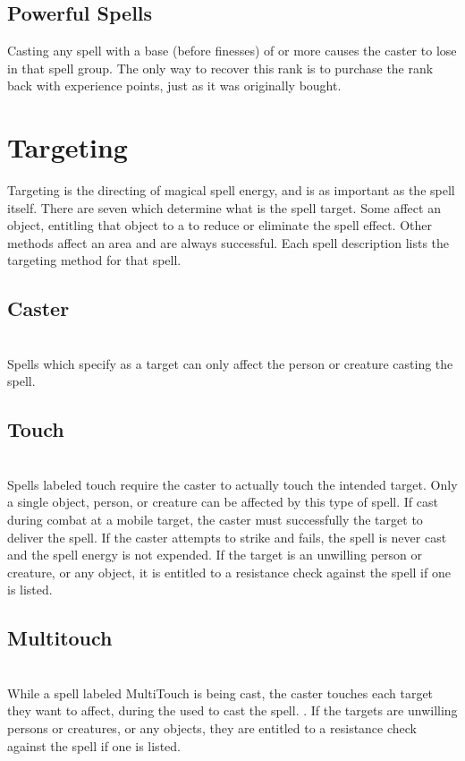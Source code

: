 \begin{multicols*}{2}
\subsection{Powerful Spells}
Casting any spell with a base  (before finesses) of  or more causes the caster to lose  in that spell group. The only way to recover this rank is to purchase the rank back with experience points, just as it was originally bought.
\section{Targeting}
Targeting is the directing of magical spell energy, and is as important as the spell itself. There are seven  which determine what is the spell target. Some affect an object, entitling that object to a  to reduce or eliminate the spell effect. Other methods affect an area and are always successful. Each spell description lists the targeting method for that spell.
\subsection{Caster}
\\
Spells which specify  as a target can only
affect the person or creature casting the spell.
\subsection{Touch}
\\
Spells labeled touch require the caster to actually touch the intended target. Only a single object, person, or creature can be affected by this type of spell. If cast during combat at a mobile target, the caster must successfully  the target to deliver the spell. If the caster attempts to strike and fails, the spell is never cast and the spell energy is not expended. If the target is an unwilling person or creature,
or any object, it is entitled to a resistance check against the spell if one is listed.
\subsection{Multitouch}
\\
While a spell labeled MultiTouch is being cast, the caster touches each target they want to affect, during the  used to cast the spell. . If the targets are unwilling persons or creatures, or any objects, they are entitled to a resistance check against the spell if one is listed.

\end{multicols*}
